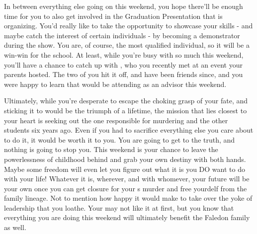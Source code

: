 \documentclass[char]{GL2020}
\begin{document}
In between everything else going on this weekend, you hope there’ll be enough time for you to also get involved in the Graduation Presentation that \cMusic{} is organizing. You’d really like to take the opportunity to showcase your skills - and maybe catch the interest of certain individuals - by becoming a demonstrator during the show. You are, of course, the most qualified individual, so it will be a win-win for the school.  At least, while you’re busy with so much this weekend, you’ll have a chance to catch up with \cAssistantScientist{}, who you recently met at an event your parents hosted.  The two of you hit it off, and have been friends since, and you were happy to learn that \cAssistantScientist{\they} would be attending as an advisor this weekend.

Ultimately, while you’re desperate to escape the choking grasp of your fate, and sticking it to \cDiplomat{} would be the triumph of a lifetime, the mission that lies closest to your heart is seeking out the one responsible for murdering \cHeirSibling{} and the other students six years ago. Even if you had to sacrifice everything else you care about to do it, it would be worth it to you. You are going to get to the truth, and nothing is going to stop you. This weekend is your chance to leave the powerlessness of childhood behind and grab your own destiny with both hands. Maybe some freedom will even let you figure out what it is you DO want to do with your life! Whatever it is, wherever, and with whomever, your future will be your own once you can get closure for your \cHeirSibling{\sibling}s murder and free yourdelf from the family lineage. Not to mention how happy it would make \cAmbition{} to take over the yoke of leadership that you loathe. Your \cFaledonParent{\parent} may not like it at first, but you know that everything you are doing this weekend will ultimately benefit the Faledon family as well.




\end{document}
